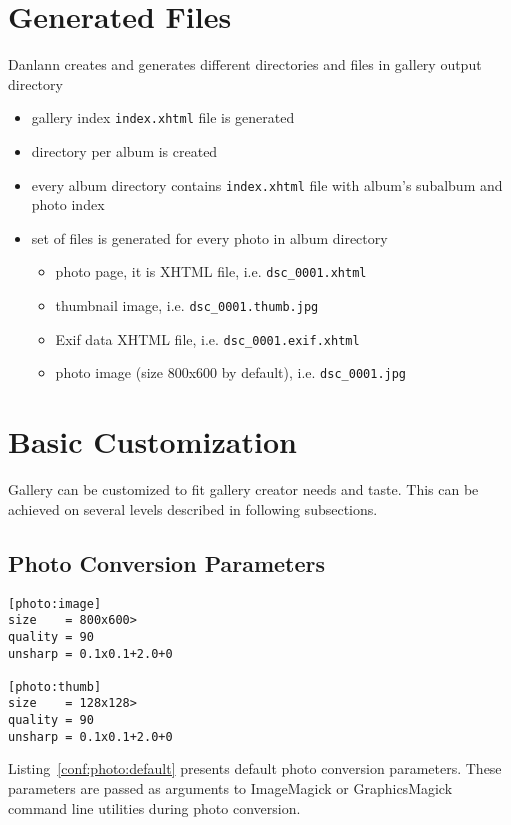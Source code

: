 \documentclass{article}
\begin{document}
\section{Generated Files}\label{generated}
Danlann creates and generates different directories and files
in gallery output directory
\begin{itemize}
\item gallery index \texttt{index.xhtml} file is generated
\item directory per album is created
\item every album directory contains \texttt{index.xhtml} file
    with album's subalbum and photo index
\item set of files is generated for every photo in album directory
    \begin{itemize}
    \item photo page, it is XHTML file, i.e. \texttt{dsc\_0001.xhtml}
    \item thumbnail image, i.e. \texttt{dsc\_0001.thumb.jpg}
    \item Exif data XHTML file, i.e. \texttt{dsc\_0001.exif.xhtml}
    \item photo image (size 800x600 by default),
        i.e. \texttt{dsc\_0001.jpg}
    \end{itemize}
\end{itemize}

\section{Basic Customization}\label{customization}
Gallery can be customized to fit gallery creator needs and taste. This can
be achieved on several levels described in following subsections.


\subsection{Photo Conversion Parameters}\label{conversion}
\begin{listing}
\begin{lstlisting}
[photo:image]
size    = 800x600>
quality = 90
unsharp = 0.1x0.1+2.0+0

[photo:thumb]
size    = 128x128>
quality = 90
unsharp = 0.1x0.1+2.0+0
\end{lstlisting}
\caption{Default photo conversion parameters}\label{conf:photo:default}
\end{listing}
Listing~\ref{conf:photo:default} presents default photo conversion
parameters. These parameters are passed as arguments to ImageMagick or GraphicsMagick
command line utilities during photo conversion.
\end{document}
